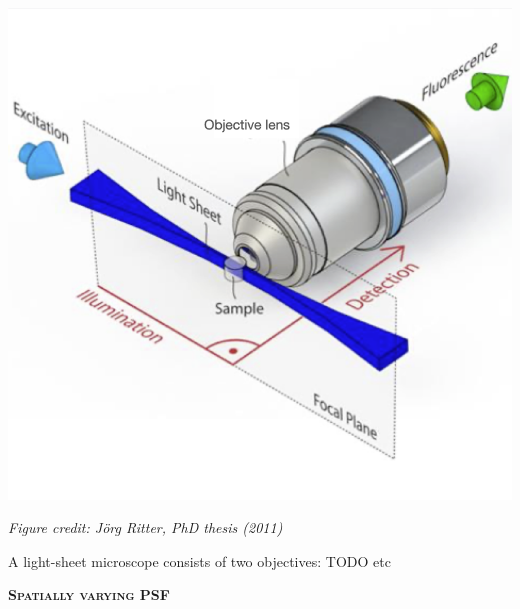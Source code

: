 \documentclass[a0paper,portrait,fontscale=0.35]{baposter}
\newcommand{\mycaption}[1]{
  {
    \smaller
    \emph{#1}
  }
}
\theoremstyle{plain}
\theoremstyle{plain}
\theoremstyle{definition}
\theoremstyle{plain}
\theoremstyle{definition}
\begin{document}
\begin{poster}
{\begin{minipage}[t]{\textwidth}
\begin{minipage}[t]{0.48\textwidth}
      \begin{minipage}[t]{\textwidth}
        \centering
        \includegraphics[width=\textwidth]{img/spim.png}
       
        \mycaption{Figure credit: J\"{o}rg Ritter, PhD thesis (2011)}
      \end{minipage}
     

      \hspace{1em}
      
      A light-sheet microscope consists of two objectives: TODO etc
    
    \end{minipage}
    \begin{minipage}[t]{0.48\textwidth}
      \begin{center}
        \larger
        {\color{blue}\textbf{\textsc{Spatially varying PSF}}}\\
      \end{center}
      

\end{minipage}
\end{minipage}}
\end{poster}
\end{document}

